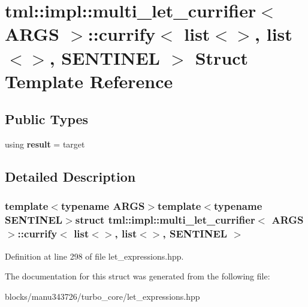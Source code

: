 \hypertarget{structtml_1_1impl_1_1multi__let__currifier_1_1currify_3_01list_3_4_00_01list_3_4_00_01_s_e_n_t_i_n_e_l_01_4}{\section{tml\+:\+:impl\+:\+:multi\+\_\+let\+\_\+currifier$<$ A\+R\+G\+S $>$\+:\+:currify$<$ list$<$$>$, list$<$$>$, S\+E\+N\+T\+I\+N\+E\+L $>$ Struct Template Reference}
\label{structtml_1_1impl_1_1multi__let__currifier_1_1currify_3_01list_3_4_00_01list_3_4_00_01_s_e_n_t_i_n_e_l_01_4}
}
\subsection*{Public Types}
\begin{DoxyCompactItemize}
\item 
\hypertarget{structtml_1_1impl_1_1multi__let__currifier_1_1currify_3_01list_3_4_00_01list_3_4_00_01_s_e_n_t_i_n_e_l_01_4_ade1d9c41fcd5c827bdf779fd100d8191}{using {\bfseries result} = target}\label{structtml_1_1impl_1_1multi__let__currifier_1_1currify_3_01list_3_4_00_01list_3_4_00_01_s_e_n_t_i_n_e_l_01_4_ade1d9c41fcd5c827bdf779fd100d8191}

\end{DoxyCompactItemize}


\subsection{Detailed Description}
\subsubsection*{template$<$typename A\+R\+G\+S$>$template$<$typename S\+E\+N\+T\+I\+N\+E\+L$>$struct tml\+::impl\+::multi\+\_\+let\+\_\+currifier$<$ A\+R\+G\+S $>$\+::currify$<$ list$<$$>$, list$<$$>$, S\+E\+N\+T\+I\+N\+E\+L $>$}



Definition at line 298 of file let\+\_\+expressions.\+hpp.



The documentation for this struct was generated from the following file\+:\begin{DoxyCompactItemize}
\item 
blocks/manu343726/turbo\+\_\+core/let\+\_\+expressions.\+hpp\end{DoxyCompactItemize}
